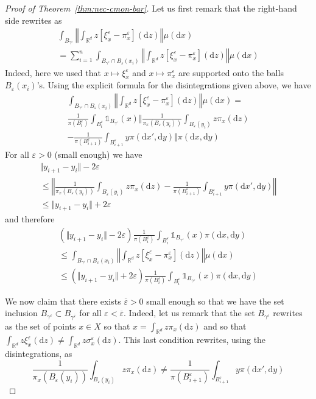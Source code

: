 \documentclass[10pt,a4paper]{amsart}
\newcommand{\R}{\mathbb{R}}
\newcommand{\dd}{\mathrm{d}}
\newcommand{\eps}{\varepsilon}
\begin{document}
\begin{proof}[Proof of Theorem~\ref{thm:nec-cmon-bar}]
     Let us first remark that the right-hand side rewrites as 
	 \begin{multline}
	     \int_{B_{\gamma^\eps}} \left\Vert \int_{\R^d} z [\xi^\eps_x - \pi^\eps_x](\dd z) \right\Vert \mu(\dd x) \\ = \sum_{i = 1}^n 	\int_{B_{\gamma^\eps} \cap B_\eps(x_i)} \left\Vert \int_{\R^d} z [\xi^\eps_x - \pi^\eps_x](\dd z) \right\Vert \mu(\dd x)
	 \end{multline}
    Indeed, here we used that $x \mapsto \xi_x^\eps$ and $x \mapsto \pi_x^\eps$ are supported onto the balls $B_\eps(x_i)$'s. Using the explicit formula for the disintegrations given above, we have 
     \begin{multline}
             \int_{B_{\gamma^\eps} \cap B_\eps(x_i)} \left\Vert \int_{\R^d} z [\xi^\eps_x - \pi^\eps_x](\dd z) \right\Vert \mu(\dd x) =\\
             \frac{1}{\pi(B_i^\eps)} \int_{B_i^\eps} \mathds{1}_{B_{\gamma^\eps}}(x) \Bigg\Vert \frac{1}{\pi_x(B_\eps(y_i))}\int_{B_\eps(y_i)}z \pi_x(\dd z) \\- \frac1{\pi(B_{i+1}^\eps)} \int_{B_{i+1}^\eps} y\pi(\dd x', \dd y)\Bigg \Vert \pi(\dd x, \dd y)
     \end{multline}
     For all $\eps > 0$ (small enough) we have 
     \begin{multline}
     \Vert y_{i+1} - y_i \Vert - 2\eps \\\leq \left\Vert \frac{1}{\pi_x(B_\eps(y_i))}\int_{B_\eps(y_i)}z \pi_x(\dd z) - \frac1{\pi(B_{i+1}^\eps)} \int_{B_{i+1}^\eps} y\pi(\dd x', \dd y)\right \Vert \\\leq \Vert y_{i+1} - y_i \Vert + 2\eps
     \end{multline}
     and therefore 
     \begin{multline}
         (\Vert y_{i+1} - y_i \Vert - 2\eps)\frac{1}{\pi(B_i^\eps)} \int_{B_i^\eps} \mathds{1}_{B_{\gamma^\eps}}(x) \pi(\dd x, \dd y)  \\
         \leq
         \int_{B_{\gamma^\eps} \cap B_\eps(x_i)} \left\Vert \int_{\R^d} z [\xi^\eps_x - \pi^\eps_x](\dd z) \right\Vert \mu(\dd x) \\
         \leq (\Vert y_{i+1} - y_i \Vert + 2\eps)\frac{1}{\pi(B_i^\eps)} \int_{B_i^\eps} \mathds{1}_{B_{\gamma^\eps}}(x) \pi(\dd x, \dd y)
     \end{multline}


We now claim that there exists $\overline{\eps} > 0$ small enough so that we have the set inclusion $B_{\gamma^\eps} \subset B_{\gamma^{\overline{\eps}}}$ for all $\eps < \overline{\eps}$. Indeed, let us remark that the set $B_{\gamma^\eps}$ rewrites as the set of points $x \in X$ so that $x = \int_{\R^d} z \pi_x(\dd z)$ and so that $\int_{\R^d} z \xi^\eps_x(\dd z) \neq \int_{\R^d} z \sigma^\eps_x(\dd z)$. This last condition rewrites, using the disintegrations, as 
\begin{equation}\label{eq:b_gamma_eps_}
    \frac{1}{\pi_x(B_\eps(y_i))} \int_{B_\eps(y_i)} z \pi_x(\dd z) \neq \frac{1}{\pi(B_{i+1}^\eps)} \int_{B_{i+1}^\eps} y \pi(\dd x', \dd y)
\end{equation}


\end{proof}
\end{document}
